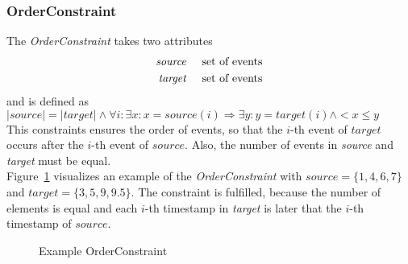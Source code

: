 	\subsubsection{OrderConstraint}
		The \emph{OrderConstraint} takes two attributes
		\begin{align*}
			\emph{source} & \hspace{.5cm}\text{set of events}\\
			\emph{target} & \hspace{.5cm}\text{set of events}
		\end{align*}
		and is defined as\\[10pt]
		\begin{math}
			|source| = |target| \land \forall i:\exists x: x=source(i)\Rightarrow \exists y: y=target(i)\land < x \leq y
		\end{math}\\[10pt]
		This constraints ensures the order of events, so that the $i$-th event of $target$ occurs after the $i$-th event of $source$. Also, the number of events in \emph{source} and \emph{target} must be equal.\\
		Figure~\ref{fig:OrderConstraintExample} visualizes an example of the \emph{OrderConstraint} with $source = \{1, 4, 6, 7\}$ and $target = \{3, 5, 9, 9.5\}$. The constraint is fulfilled, because the number of elements is equal and each $i$-th timestamp in \emph{target} is later that the $i$-th timestamp of $source$.
		\begin{figure}
			\caption{Example OrderConstraint}
			\label{fig:OrderConstraintExample}
		\end{figure}
		
		
